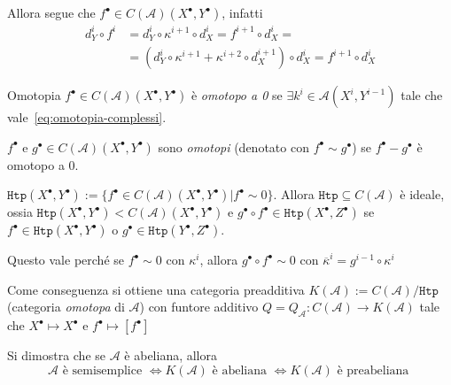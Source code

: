 Allora segue che \(f^\bullet \in C{(\mathcal{A})}{(X^\bullet, Y^\bullet)}\),
infatti
\begin{align*}{}
   d_Y^{i} \circ f^{i} &= d_Y^{i} \circ \kappa^{i+1} \circ
   d_X^{i} = f^{i+1} \circ d_X^{i} = \\&={(d_Y^{i} \circ \kappa^{i+1} + \kappa^{i+2}
   \circ d_X^{i+1})} \circ d_X^{i} = f^{i+1} \circ d_X^{i}
\end{align*}


\begin{definition}{Omotopia}
    \(f^\bullet \in C{(\mathcal{A})}{(X^{\bullet }, Y^{\bullet})}\) è
    \emph{omotopo a 0} se \(\exists k^{i} \in \mathcal{A}{(X^{i}, Y^{i-1})}\)
    tale che vale~\eqref{eq:omotopia-complessi}.

    \(f^{\bullet}\) e \(g^\bullet \in C{(\mathcal{A})}{(X^\bullet, Y^\bullet)}\)
    sono \emph{omotopi} (denotato con \(f^\bullet \sim g^\bullet\)) se
    \(f^\bullet - g^\bullet \) è omotopo a 0.
\end{definition}

\begin{remark}{} 
    \(\mathtt{Htp}{(X^\bullet, Y^\bullet)} := \{f^\bullet \in C{(\mathcal{A})}
    {(X^\bullet, Y^\bullet)} | f^\bullet \sim 0\} \). Allora \(\mathtt{Htp}
    \subseteq C{(\mathcal{A})} \) è ideale, ossia \(\mathtt{Htp}{(X^\bullet,
    Y^\bullet)} < C{(\mathcal{A})}{(X^\bullet, Y^\bullet)}\) e \(g^\bullet \circ
    f^\bullet \in \mathtt{Htp}{(X^\bullet, Z^\bullet)}\) se \(f^\bullet \in
    \mathtt{Htp}{(X^\bullet, Y^\bullet)}\) o \(g^\bullet \in
    \mathtt{Htp}{(Y^\bullet, Z^\bullet)}\).

    Questo vale perché se \(f^\bullet \sim 0\) con \(\kappa^{i}\), allora
    \(g^\bullet \circ f^\bullet \sim 0\) con \(\overline{\kappa}^{i} = g^{i-1}
    \circ \kappa^{i}\) 
\end{remark}

Come conseguenza si ottiene una categoria preadditiva \(K{(\mathcal{A})} :=
C{(\mathcal{A})} / \mathtt{Htp}\) (categoria \emph{omotopa} di \(\mathcal{A}\))
con funtore additivo \(Q = Q_{\mathcal{A}} : C{(\mathcal{A})} \to
K{(\mathcal{A})}\) tale che \(X^\bullet \mapsto X^\bullet\) e \(f^\bullet
\mapsto [f^\bullet]\) 



\begin{remark}{}
    Si dimostra che se \(\mathcal{A}\) è abeliana, allora 
    \[
      \mathcal{A} \text{ è semisemplice } \iff K{(\mathcal{A})}\text{ è abeliana
      } \iff K{(\mathcal{A})}\text{ è preabeliana }
    \]
\end{remark}

